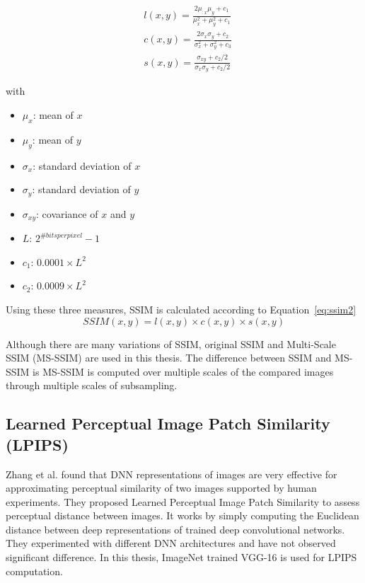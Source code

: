 \begin{equation}
    \label{eq:ssim1}
    \begin{aligned}
         & l(x, y)=\frac{2 \mu_{: x} \mu_{y}+c_{1}}{\mu_{x}^{2}+\mu_{y}^{2}+c_{1}}           \\
         & c(x, y)=\frac{2 \sigma_{x} \sigma_{y}+c_{2}}{\sigma_{x}^{2}+\sigma_{y}^{2}+c_{3}} \\
         & s(x, y)=\frac{\sigma_{x y}+c_{2}/2}{\sigma_{x} \sigma_{y}+c_{2}/2}
    \end{aligned}
\end{equation}

with
\begin{itemize}
    \item \(\mu_x\): mean of \(x\)
    \item \(\mu_y\): mean of \(y\)
    \item \(\sigma_x\): standard deviation of \(x\)
    \item \(\sigma_y\): standard deviation of \(y\)
    \item \(\sigma_{xy}\): covariance of \(x\) and \(y\)
    \item \(L\): \(2^{\#bits per pixel}-1\)
    \item \(c_1\): \(0.0001 \times L^2\)
    \item \(c_2\): \(0.0009 \times L^2\)
\end{itemize}

Using these three measures, SSIM is calculated according to Equation~\ref{eq:ssim2}
\begin{equation}
    \label{eq:ssim2}
    SSIM(x,y) = l(x,y) \times c(x,y) \times s(x,y)
\end{equation}

Although there are many variations of SSIM, original SSIM and Multi-Scale SSIM (MS-SSIM) are used in this thesis. The difference between SSIM and MS-SSIM is MS-SSIM is computed over multiple scales of the compared images through multiple scales of subsampling.

\subsection{Learned Perceptual Image Patch Similarity (LPIPS)}
Zhang et al. found that DNN representations of images are very effective for approximating perceptual similarity of two images supported by human experiments. They proposed Learned Perceptual Image Patch Similarity to assess perceptual distance between images. It works by simply computing the Euclidean distance between deep representations of trained deep convolutional networks. They experimented with different DNN architectures and have not observed significant difference. In this thesis, ImageNet trained VGG-16 is used for LPIPS computation.

